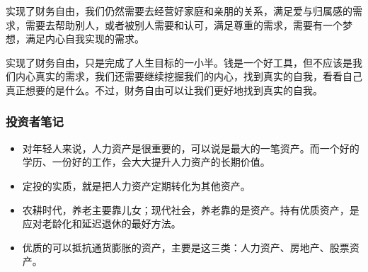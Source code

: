 实现了财务自由，我们仍然需要去经营好家庭和亲朋的关系，满足爱与归属感的需求，需要去帮助别人，或者被别人需要和认可，满足尊重的需求，需要有一个梦想，满足内心自我实现的需求。

实现了财务自由，只是完成了人生目标的一小半。钱是一个好工具，但不应该是我们内心真实的需求，我们还需要继续挖掘我们的内心，找到真实的自我，看看自己真正想要的是什么。不过，财务自由可以让我们更好地找到真实的自我。

\subsubsection{投资者笔记}

\begin{itemize}
\item {\kaishu 对年轻人来说，人力资产是很重要的，可以说是最大的一笔资产。而一个好的学历、一份好的工作，会大大提升人力资产的长期价值。}
\item {\kaishu 定投的实质，就是把人力资产定期转化为其他资产。}
\item {\kaishu 农耕时代，养老主要靠儿女；现代社会，养老靠的是资产。持有优质资产，是应对老龄化和延迟退休的最好方法。}
\item {\kaishu 优质的可以抵抗通货膨胀的资产，主要是这三类：人力资产、房地产、股票资产。}
\end{itemize}

